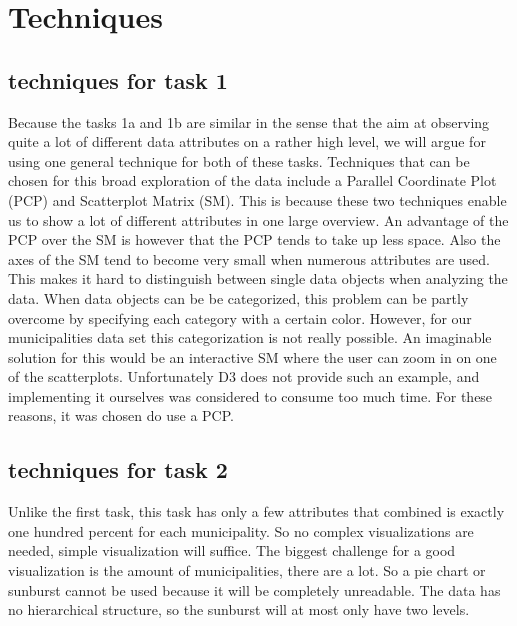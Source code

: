 \section{Techniques}

\subsection{techniques for task 1}
Because the tasks 1a and 1b are similar in the sense that the aim at observing quite a lot of different data attributes on a rather high level, we will argue for using one general technique for both of these tasks. Techniques that can be chosen for this broad exploration of the data include a Parallel Coordinate Plot (PCP) and Scatterplot Matrix (SM). This is because these two techniques enable us to show a lot of different attributes in one large overview. An advantage of the PCP over the SM is however that the PCP tends to take up less space. Also the axes of the SM tend to become very small when numerous attributes are used. This makes it hard to distinguish between single data objects when analyzing the data. When data objects can be be categorized, this problem can be partly overcome by specifying each category with a certain color. However, for our municipalities data set this categorization is not really possible. An imaginable solution for this would be an interactive SM where the user can zoom in on one of the scatterplots. Unfortunately D3 \cite{D3} does not provide such an example, and implementing it ourselves was considered to consume too much time. For these reasons, it was chosen do use a PCP.




\subsection{techniques for task 2}
Unlike the first task, this task has only a few attributes that combined is exactly one hundred percent for each municipality.
So no complex visualizations are needed, simple visualization will suffice.
The biggest challenge for a good visualization is the amount of municipalities, there are a lot.
So a pie chart or sunburst cannot be used because it will be completely unreadable.
The data has no hierarchical structure, so the sunburst will at most only have two levels.

